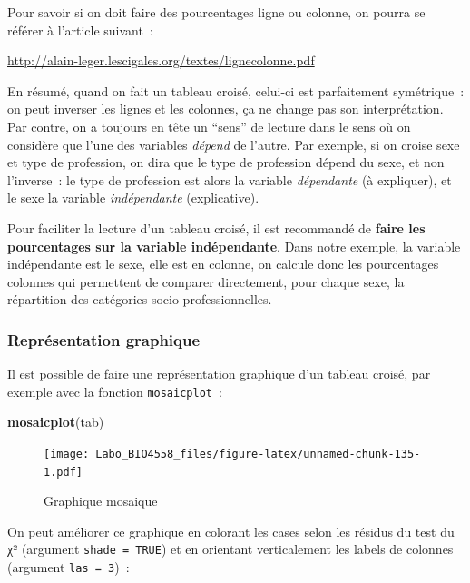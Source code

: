 \documentclass[
  12pt,
]{book}
\makeatletter
\newenvironment{Shaded}{\begin{snugshade}}{\end{snugshade}}
\newcommand{\KeywordTok}[1]{\textcolor[rgb]{0.13,0.29,0.53}{\textbf{#1}}}
\newcommand{\NormalTok}[1]{#1}
\newenvironment{kframe}{%
\medskip{}
\setlength{\fboxsep}{.8em}
\def\at@end@of@kframe{}%
\ifinner\ifhmode%
 \def\at@end@of@kframe{\end{minipage}}%
 \begin{minipage}{\columnwidth}%
\fi\fi%
\def\FrameCommand##1{\hskip\@totalleftmargin \hskip-\fboxsep
\colorbox{incolor}{##1}\hskip-\fboxsep
    \hskip-\linewidth \hskip-\@totalleftmargin \hskip\columnwidth}%
\MakeFramed {\advance\hsize-\width
  \@totalleftmargin\z@ \linewidth\hsize
  \@setminipage}}%
{\par\unskip\endMakeFramed%
\at@end@of@kframe}
\newenvironment{rmdblock}[1]
 {
 \begin{itemize}
 \renewcommand{\labelitemi}{
   \raisebox{-.7\height}[0pt][0pt]{
     {\setkeys{Gin}{width=3em,keepaspectratio}\texttt{[image: images/\#1]}}
   }
 }
 \begin{kframe}
 \setlength{\fboxsep}{1em}
 \item
 }
 {
 \end{kframe}
 \end{itemize}
 }
\newenvironment{rmdnote}
  {\begin{rmdblock}{note}}
  {\end{rmdblock}}
\makeatother
\begin{document}
\begin{rmdnote}
Pour savoir si on doit faire des pourcentages ligne ou colonne, on
pourra se référer à l'article suivant~:

\url{http://alain-leger.lescigales.org/textes/lignecolonne.pdf}

En résumé, quand on fait un tableau croisé, celui-ci est parfaitement
symétrique~: on peut inverser les lignes et les colonnes, ça ne change
pas son interprétation. Par contre, on a toujours en tête un ``sens'' de
lecture dans le sens où on considère que l'une des variables
\emph{dépend} de l'autre. Par exemple, si on croise sexe et type de
profession, on dira que le type de profession dépend du sexe, et non
l'inverse~: le type de profession est alors la variable
\emph{dépendante} (à expliquer), et le sexe la variable
\emph{indépendante} (explicative).

Pour faciliter la lecture d'un tableau croisé, il est recommandé de
\textbf{faire les pourcentages sur la variable indépendante}. Dans notre
exemple, la variable indépendante est le sexe, elle est en colonne, on
calcule donc les pourcentages colonnes qui permettent de comparer
directement, pour chaque sexe, la répartition des catégories
socio-professionnelles.
\end{rmdnote}

\hypertarget{repruxe9sentation-graphique-1}{%
\subsubsection{Représentation graphique}\label{repruxe9sentation-graphique-1}}

Il est possible de faire une représentation graphique d'un tableau croisé, par exemple avec la fonction \texttt{mosaicplot}~:

\begin{Shaded}
\begin{Highlighting}[]
\KeywordTok{mosaicplot}\NormalTok{(tab)}
\end{Highlighting}
\end{Shaded}

\begin{figure}
\centering
\texttt{[image: Labo\_BIO4558\_files/figure-latex/unnamed-chunk-135-1.pdf]}
\caption{\label{fig:unnamed-chunk-135}Graphique mosaique}
\end{figure}

On peut améliorer ce graphique en colorant les cases selon les résidus du test du χ² (argument \texttt{shade\ =\ TRUE}) et en orientant verticalement les labels de colonnes (argument \texttt{las\ =\ 3})~:
\end{document}
